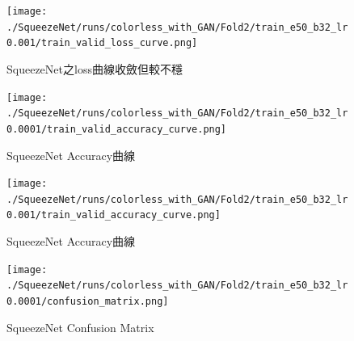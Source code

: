 \begin{figure}[H]
    \centering
    \texttt{[image: ./SqueezeNet/runs/colorless\_with\_GAN/Fold2/train\_e50\_b32\_lr0.001/train\_valid\_loss\_curve.png]}
    \caption{SqueezeNet之loss曲線收斂但較不穩}
    \label{fig:SqueezeNet_unconvergence_loss_curve_1e-3}
\end{figure}
\begin{figure}[H]
    \centering
    \texttt{[image: ./SqueezeNet/runs/colorless\_with\_GAN/Fold2/train\_e50\_b32\_lr0.0001/train\_valid\_accuracy\_curve.png]}
    \caption{SqueezeNet Accuracy曲線}
    \label{fig:SqueezeNet_accuracy_curve_0.96}
\end{figure}
\begin{figure}[H]
    \centering
    \texttt{[image: ./SqueezeNet/runs/colorless\_with\_GAN/Fold2/train\_e50\_b32\_lr0.001/train\_valid\_accuracy\_curve.png]}
    \caption{SqueezeNet Accuracy曲線}
    \label{fig:SqueezeNet_accuracy_curve_0.69}
\end{figure}
\begin{figure}[H]
    \centering
    \texttt{[image: ./SqueezeNet/runs/colorless\_with\_GAN/Fold2/train\_e50\_b32\_lr0.0001/confusion\_matrix.png]}
    \caption{SqueezeNet Confusion Matrix}
    \label{fig:SqueezeNet_confuson_matrix}
\end{figure}
%

